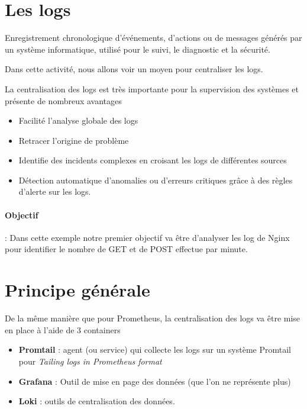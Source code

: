 \documentclass[french, 12pt]{article}%
\newcommand{\itemE}{\item[$\bullet$]}
\newcommand{\titreencadre}{Titre}
\newenvironment{encadre}[1]{\renewcommand{\titreencadre}{#1}
	\begin{mdframed}[style=encadrestyle]
	\vspace{0.5\baselineskip}
	}{%
	\end{mdframed}}
\begin{document}
\tableofcontents
\newpage


\section{Les logs}

\begin{encadre}{Log}
Enregistrement chronologique d'événements, d'actions ou de messages générés par un système informatique, utilisé pour le suivi, le diagnostic et la sécurité.
\end{encadre}

Dans cette activité, nous allons voir un moyen pour centraliser les logs. 


La centralisation des logs est très importante pour la supervision des systèmes  et présente de nombreux avantages 
\begin{itemize}
\itemE Facilité l'analyse globale des logs
\itemE Retracer l'origine de problème
\itemE Identifie des incidents complexes en croisant les logs de différentes sources 
\itemE Détection automatique d’anomalies ou d’erreurs critiques grâce à des règles d’alerte sur les logs.

\end{itemize}


\paragraph{Objectif } : Dans cette exemple notre premier objectif va être d'analyser les log de Nginx pour identifier le nombre de GET et de POST effectue par minute. 


\section{Principe générale}
De la même manière que pour Prometheus, la centralisation des logs va être mise en place à l'aide de 3 containers 
\begin{itemize}
\itemE \textbf{Promtail} : agent (ou service) qui collecte les logs sur un système Promtail pour \textit{Tailing logs in Prometheus format}
\itemE  \textbf{Grafana} : Outil de mise en page des données (que l'on ne représente plus)
\itemE  \textbf{Loki} : outils de centralisation des données.
\end{itemize}
\end{document}
